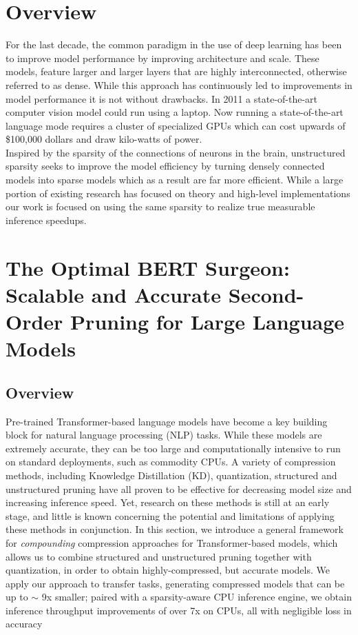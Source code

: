 \section{Overview}
For the last decade, the common paradigm in the use of deep learning has been to improve model performance by improving architecture and scale. These models, feature larger and larger layers that are highly interconnected, otherwise referred to as dense. While this approach has continuously led to improvements in model performance it is not without drawbacks. In 2011 a state-of-the-art computer vision model could run using a laptop. Now running a state-of-the-art language mode requires a cluster of specialized GPUs which can cost upwards of \$100,000 dollars and draw kilo-watts of power. \\
Inspired by the sparsity of the connections of neurons in the brain, unstructured sparsity seeks to improve the model efficiency by turning densely connected models into sparse models which as a result are far more efficient. While a large portion of existing research has focused on theory and high-level implementations our work is focused on using the same sparsity to realize true measurable inference speedups. 
\section{The Optimal BERT Surgeon: Scalable and Accurate Second-Order Pruning for Large Language Models}
\subsection{Overview}
Pre-trained Transformer-based language models have become a key building block for natural language processing (NLP) tasks. While these models are extremely accurate, they can be too large and computationally intensive to run on standard deployments, such as commodity CPUs. A variety of compression methods, including Knowledge Distillation (KD), quantization, structured and unstructured pruning have all proven to be effective for decreasing model size and increasing inference speed. Yet, research on these methods is still at an early stage, and little is known concerning the potential and limitations of applying these methods in conjunction.  
In this section, we introduce a general framework for \emph{compounding} compression approaches for Transformer-based models, which allows us to combine structured and unstructured pruning together with quantization, in order to obtain highly-compressed, but accurate models.   
We apply our approach to transfer tasks, generating compressed models that can be up to $\sim$ 9x smaller; 
paired with a sparsity-aware CPU inference engine, we obtain inference throughput improvements of over 7x on CPUs, all with negligible loss in accuracy 

